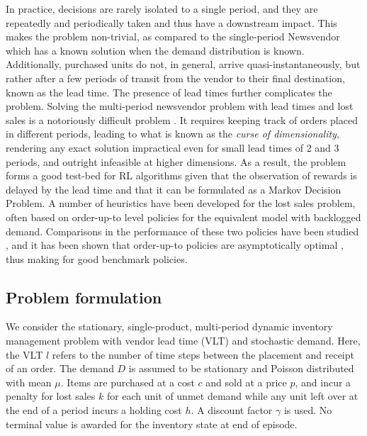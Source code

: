 \documentclass[letterpaper]{article} %
\begin{document}
In practice, decisions are rarely isolated to a single period, and they are repeatedly and periodically taken and thus have a downstream impact. This makes the problem non-trivial, as compared to the single-period Newsvendor which has a known solution when the demand distribution is known. Additionally, purchased units do not, in general, arrive quasi-instantaneously, but rather after a few periods of transit from the vendor to their final destination, known as the lead time. The presence of lead times further complicates the problem. Solving the multi-period newsvendor problem with lead times and lost sales is a notoriously difficult problem \cite{zipkin2008old}. It requires keeping track of orders placed in different periods, leading to what is known as the \emph{curse of dimensionality}, rendering any exact solution impractical even for small lead times of 2 and 3 periods, and outright infeasible at higher dimensions. As a result, the problem forms a good test-bed for RL algorithms given that the observation of rewards is delayed by the lead time and that it can be formulated as a Markov Decision Problem. A number of heuristics have been developed for the lost sales problem, often based on order-up-to level policies for the equivalent model with backlogged demand. Comparisons in the performance of these two policies have been studied \cite{janakiraman2007comparison}, and it has been shown that order-up-to policies are asymptotically optimal \cite{huh2009asymptotic}, thus making for good benchmark policies.

\subsection{Problem formulation}
We consider the stationary, single-product, multi-period dynamic inventory management problem with vendor lead time (VLT) and stochastic demand. Here, the VLT $l$  refers to the number of time steps between the placement  and receipt of an order. The demand $D$ is assumed to be stationary and Poisson distributed with mean $\mu$. Items are purchased at a cost $c$ and sold at a price $p$, and incur a penalty for lost sales $k$ for each unit of unmet demand while any unit left over at the end of a period incurs a holding cost $h$. A discount factor $\gamma$ is used.  No terminal value is awarded for the inventory state at end of episode.
\end{document}
